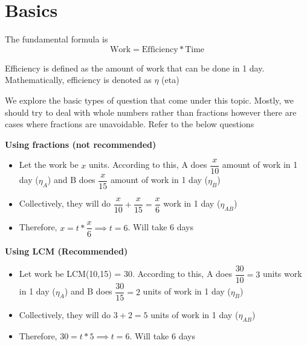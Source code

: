 \section{Basics}
The fundamental formula is 
$$
\text{Work} = \text{Efficiency} * \text{Time}
$$

\begin{NOTE}
    Efficiency is defined as the amount of work that can be done in 1 day. Mathematically, efficiency is denoted as $\eta$ (eta)
\end{NOTE}

We explore the basic types of question that come under this topic. Mostly, we should try to deal with whole numbers rather than fractions however there are cases where fractions are unavoidable. Refer to the below questions


\begin{multicols}{2}

    \textbf{Using fractions (not recommended)}

    \begin{itemize}
        \item Let the work be $x$ units. According to this, A does $\dfrac{x}{10}$ amount of work in 1 day ($\eta_A$) and B does $\dfrac{x}{15}$ amount of work in 1 day ($\eta_B$)
        \item Collectively, they will do $\dfrac{x}{10} + \dfrac{x}{15} = \dfrac{x}{6}$ work in 1 day ($\eta_{AB}$)
        \item Therefore, $x = t * \dfrac{x}{6} \implies t = 6$. Will take 6 days
    \end{itemize}

    \columnbreak
    
    \textbf{Using LCM (Recommended)}
    \begin{itemize}
        \item Let work be LCM(10,15) = 30. According to this, A does $\dfrac{30}{10} = 3$ units work in 1 day ($\eta_A$) and B does $\dfrac{30}{15} = 2$ units of work in 1 day ($\eta_B$)
        \item Collectively, they will do $3 + 2 = 5$ units of work in 1 day ($\eta_{AB}$)
        \item Therefore, $30 = t * 5 \implies t = 6$. Will take 6 days
    \end{itemize}

\end{multicols}

